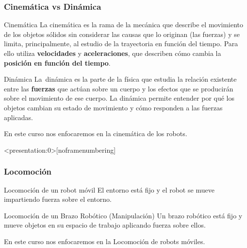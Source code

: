 \begin{frame}
	\frametitle{Cinemática vs Dinámica}
	\begin{block}{Cinemática}
		La cinemática es la rama de la mecánica que describe el movimiento de los objetos sólidos sin considerar las causas que lo originan (las fuerzas) y se limita, principalmente, al estudio de la trayectoria en función del tiempo. Para ello utiliza \textbf{velocidades} y \textbf{aceleraciones}, que describen cómo cambia la \textbf{posición en función del tiempo}.
	\end{block}
	
	\begin{block}{Dinámica}
		La dinámica es la parte de la física que estudia la relación existente entre las \textbf{fuerzas} que actúan sobre un cuerpo y los efectos que se producirán sobre el movimiento de ese cuerpo. La dinámica permite entender por qué los objetos cambian su estado de movimiento y cómo responden a las fuerzas aplicadas.
	\end{block}
	
	En este curso nos enfocaremos en la cinemática de los robots.
	
	
\end{frame}


\begin{frame}<presentation:0>[noframenumbering]
	\frametitle{Locomoción}
	
	\begin{block}{Locomoción de un robot móvil}
		El entorno está fijo y el robot se mueve impartiendo fuerza sobre el entorno.
	\end{block}
	
	\begin{block}{Locomoción de un Brazo Robótico (Manipulación)}
		Un brazo robótico está fijo y mueve objetos en su espacio de trabajo aplicando fuerza sobre ellos.
	\end{block}
	
	En este curso nos enfocaremos en la Locomoción de robots móviles.
	
\end{frame}



